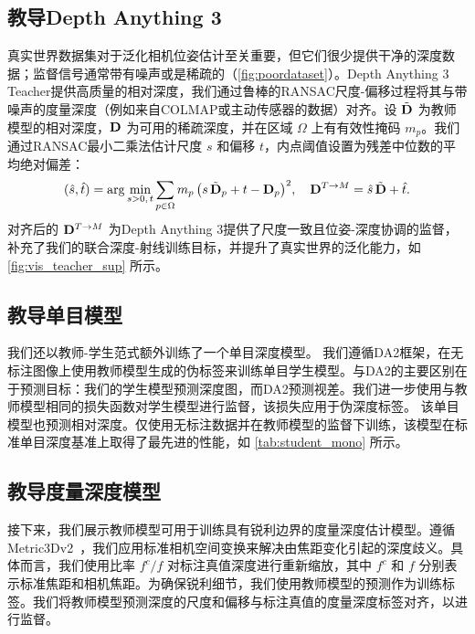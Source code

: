 \subsection{教导Depth Anything 3}
真实世界数据集对于泛化相机位姿估计至关重要，但它们很少提供干净的深度数据；监督信号通常带有噪声或是稀疏的（\cref{fig:poordataset}）。Depth Anything 3 Teacher提供高质量的相对深度，我们通过鲁棒的RANSAC尺度-偏移过程将其与带噪声的度量深度（例如来自COLMAP或主动传感器的数据）对齐。设 \(\tilde{\mathbf{D}}\) 为教师模型的相对深度，\(\mathbf{D}\) 为可用的稀疏深度，并在区域 \(\Omega\) 上有有效性掩码 \(m_p\)。我们通过RANSAC最小二乘法估计尺度 \(s\) 和偏移 \(t\)，内点阈值设置为残差中位数的平均绝对偏差：
\begin{equation}
    (\hat{s},\hat{t})
    = \arg\min_{s>0,\,t} \sum_{p\in\Omega} m_p\,\big( s\,\tilde{\mathbf{D}}_p + t - \mathbf{D}_p\big)^2,\quad
    \mathbf{D}^{T\rightarrow M} = \hat{s}\,\tilde{\mathbf{D}} + \hat{t}.\label{eq:ss_align}
\end{equation}
对齐后的 \(\mathbf{D}^{T\rightarrow M}\) 为Depth Anything 3提供了尺度一致且位姿-深度协调的监督，补充了我们的联合深度-射线训练目标，并提升了真实世界的泛化能力，如 \cref{fig:vis_teacher_sup} 所示。



\subsection{教导单目模型}

我们还以教师-学生范式额外训练了一个单目深度模型。
我们遵循DA2框架，在无标注图像上使用教师模型生成的伪标签来训练单目学生模型。与DA2的主要区别在于预测目标：我们的学生模型预测深度图，而DA2预测视差。我们进一步使用与教师模型相同的损失函数对学生模型进行监督，该损失应用于伪深度标签。
该单目模型也预测相对深度。仅使用无标注数据并在教师模型的监督下训练，该模型在标准单目深度基准上取得了最先进的性能，如 \cref{tab:student_mono} 所示。


\subsection{教导度量深度模型}
接下来，我们展示教师模型可用于训练具有锐利边界的度量深度估计模型。遵循Metric3Dv2~\cite{hu2024metric3dv2}，我们应用标准相机空间变换来解决由焦距变化引起的深度歧义。具体而言，我们使用比率 $f^c/f$ 对标注真值深度进行重新缩放，其中 $f^c$ 和 $f$ 分别表示标准焦距和相机焦距。为确保锐利细节，我们使用教师模型的预测作为训练标签。我们将教师模型预测深度的尺度和偏移与标注真值的度量深度标签对齐，以进行监督。


